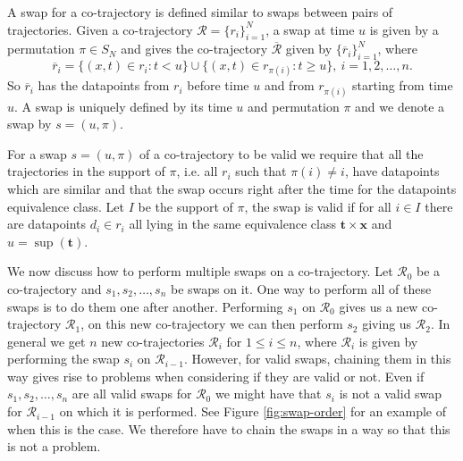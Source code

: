 \documentclass[12pt]{article}
\newcommand{\loc}{x}
\newcommand{\tim}{t}
\newcommand{\data}{d}
\newcommand{\traj}{r}
\newcommand{\cotraj}{\mathcal{R}}
\newcommand{\swap}{s}
\newcommand{\swaptime}{u}
\newcommand{\locint}{\mathbf{x}}
\newcommand{\timint}{\mathbf{t}}
\theoremstyle{definition}
\begin{document}
A swap for a co-trajectory is defined similar to swaps between pairs
of trajectories. Given a co-trajectory
\(\cotraj = \{\traj_{i}\}_{i = 1}^{N}\), a swap at time \(\swaptime\)
is given by a permutation \(\pi \in S_{N}\) and gives the
co-trajectory \(\overline{\cotraj}\) given by
\(\{\overline{\traj}_{i}\}_{i = 1}^{N}\), where
\begin{equation}
  \label{eq:swap-cotrajectory}
  \overline{\traj}_{i} = \{(\loc, \tim) \in \traj_{i}: \tim < \swaptime\} \cup \{(\loc, \tim) \in \traj_{\pi(i)}: \tim \geq \swaptime\},\ i = 1, 2, \dots, n.
\end{equation}
So \(\overline{\traj}_{i}\) has the datapoints from \(\traj_{i}\)
before time \(\swaptime\) and from \(\traj_{\pi(i)}\) starting from
time \(\swaptime\). A swap is uniquely defined by its time \(\swaptime\)
and permutation \(\pi\) and we denote a swap by
\(\swap = (\swaptime, \pi)\).

For a swap \(s = (\swaptime, \pi)\) of a co-trajectory to be valid we
require that all the trajectories in the support of \(\pi\), i.e. all
\(\traj_{i}\) such that \(\pi(i) \not= i\), have datapoints which
are similar and that the swap occurs right after the time for the
datapoints equivalence class. Let \(I\) be the support of \(\pi\),
the swap is valid if for all \(i \in I\) there are datapoints
\(\data_{i} \in \traj_{i}\) all lying in the same equivalence class
\(\timint \times \locint\) and \(\swaptime = \sup(\timint)\).

We now discuss how to perform multiple swaps on a co-trajectory. Let
\(\cotraj_{0}\) be a co-trajectory and
\(\swap_{1}, \swap_{2}, \dots, \swap_{n}\) be swaps on it. One way to
perform all of these swaps is to do them one after another. Performing
\(\swap_{1}\) on \(\cotraj_{0}\) gives us a new co-trajectory
\(\cotraj_{1}\), on this new co-trajectory we can then perform
\(\swap_{2}\) giving us \(\cotraj_{2}\). In general we get \(n\) new
co-trajectories \(\cotraj_{i}\) for \(1 \leq i \leq n\), where
\(\cotraj_{i}\) is given by performing the swap \(\swap_{i}\) on
\(\cotraj_{i-1}\). However, for valid swaps, chaining them in this way
gives rise to problems when considering if they are valid or not. Even
if \(\swap_{1}, \swap_{2}, \dots, \swap_{n}\) are all valid swaps for
\(\cotraj_{0}\) we might have that \(s_{i}\) is not a valid swap for
\(\cotraj_{i - 1}\) on which it is performed. See Figure
\ref{fig:swap-order} for an example of when this is the case. We
therefore have to chain the swaps in a way so that this is not a
problem.
\end{document}
